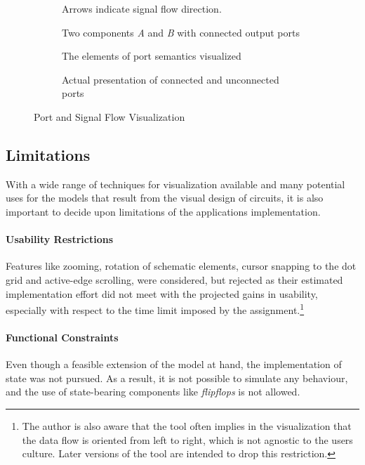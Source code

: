 	\begin{figure}
		\centering
		\begin{subfigure}{0.3\textwidth}
		 
		\caption{Two components \emph{A} and \emph{B} with connected output ports}
		\small{Arrows indicate signal flow direction.}
		\label{fig-connected-outports}
	\end{subfigure}
	\quad
	\begin{subfigure}{0.5\textwidth}
		\centering
		
		\caption{The elements of port semantics visualized}	
		\label{fig-port-semantics}
	\end{subfigure}
	
	\begin{subfigure}{0.9\textwidth}
		\centering
		
		\caption{Actual presentation of connected and unconnected ports}
		\label{fig-ports-actual}
	\end{subfigure}
	
	\caption{Port and Signal Flow Visualization}
	\end{figure}
		
\subsection{Limitations}
	\label{sec-implementations-limitation}
	
	With a wide range of techniques for visualization available and many potential uses for the models that result from the visual design of circuits, it is also important to decide upon limitations of the applications implementation.
	
	\paragraph{Usability Restrictions}
		Features like zooming, rotation of schematic elements, cursor snapping to the dot grid and active-edge scrolling, were considered, but rejected as their estimated implementation effort did not meet with the projected gains in usability, especially with respect to the time limit imposed by the assignment.\footnote{
		The author is also aware that the tool often implies in the visualization that the data flow is oriented from left to right, which is not agnostic to the users culture.
		Later versions of the tool are intended to drop this restriction.
		}
	
	\paragraph{Functional Constraints}
		Even though a feasible extension of the model at hand, the implementation of state was not pursued.
		As a result, it is not possible to simulate any behaviour, and the use of state-bearing components like \emph{flipflops} is not allowed. 